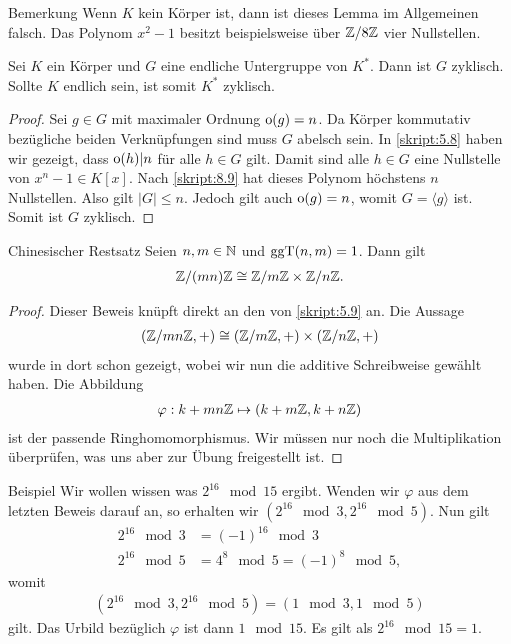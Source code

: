\begin{generic_no_num}{Bemerkung}
	Wenn $ K $ kein Körper ist, dann ist dieses Lemma im Allgemeinen falsch.
	Das Polynom $ x^2-1 $ besitzt beispielsweise über $ \mathbb{Z} / 8 \mathbb{Z} $ vier Nullstellen.
\end{generic_no_num}

\begin{sz} \label{skript:8.10}
	Sei $ K $ ein Körper und $ G $ eine endliche Untergruppe von $ K^\ast $.
	Dann ist $ G $ zyklisch.
	Sollte $ K $ endlich sein, ist somit $ K^\ast $ zyklisch.
\end{sz}

\begin{proof}
	Sei $ g \in G $ mit maximaler Ordnung $ \operatorname{o}(g) = n $.
	Da Körper kommutativ bezügliche beiden Verknüpfungen sind muss $ G $ abelsch sein.
	In \ref{skript:5.8} haben wir gezeigt, dass $ \operatorname{o}(h) | n $ für alle $ h \in G $ gilt.
	Damit sind alle $ h \in G $ eine Nullstelle von $ x^n -1 \in K[x] $.
	Nach \ref{skript:8.9} hat dieses Polynom höchstens $ n $ Nullstellen.
	Also gilt $ |G| \leq n $.
	Jedoch gilt auch $ \operatorname{o}(g) = n$, womit $ G = \langle g \rangle $ ist.
	Somit ist $ G $ zyklisch.
\end{proof}

\begin{genericthm}{Chinesischer Restsatz}\label{skript:8.11}
	Seien $ n,m \in \mathbb{N} $ und $ \operatorname{ggT}(n,m) = 1 $.
	Dann gilt
	\begin{align*}
	\mathbb{Z} / (mn) \mathbb{Z} \cong \mathbb{Z} /m \mathbb{Z} \times \mathbb{Z} /n \mathbb{Z}.
	\end{align*}
\end{genericthm}

\begin{proof}
	Dieser Beweis knüpft direkt an den von \ref{skript:5.9} an.
	Die Aussage 
	\begin{align*}
	(\mathbb{Z} / mn \mathbb{Z} , +) \cong (\mathbb{Z} / m \mathbb{Z},+) \times (\mathbb{Z} / n \mathbb{Z},+) 
	\end{align*}
	wurde in dort schon gezeigt, wobei wir nun die additive Schreibweise gewählt haben.
	Die Abbildung 
	\begin{align*}
	\varphi : k + mn\mathbb{Z} \mapsto (k + m \mathbb{Z}, k + n \mathbb{Z})
	\end{align*}
	ist der passende Ringhomomorphismus.
	Wir müssen nur noch die Multiplikation überprüfen, was uns aber zur Übung freigestellt ist.
\end{proof}

\begin{generic_no_num}{Beispiel}
	Wir wollen wissen was $ 2^{16}  \mod 15$ ergibt.
	Wenden wir $ \varphi $ aus dem letzten Beweis darauf an, so erhalten wir 
	$(2^{16} \mod 3, 2^{16} \mod 5)$.
	Nun gilt
	\begin{align*}
	2^{16} \mod 3 &= (-1)^{16} \mod 3 \\
	2^{16} \mod 5	&= 4^8 \mod 5 = (-1)^8 \mod 5,
	\end{align*}
	womit
	\begin{align*}
	(2^{16} \mod 3, 2^{16} \mod 5) = (1 \mod 3, 1 \mod 5)
	\end{align*}
	gilt. Das Urbild bezüglich $ \varphi $ ist dann $ 1 \mod 15 $.
	Es gilt als $ 2^{16} \mod 15  = 1$.
\end{generic_no_num}

